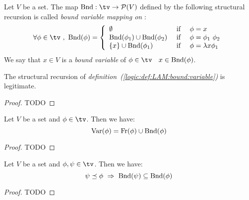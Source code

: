 \begin{defin}\label{logic:def:LAM:bound:variable}
    Let $V$ be a set. The map $\bound:\tv\to {\cal P}(V)$ defined by the
    following structural recursion is called {\em bound variable mapping on \tv}:
    \begin{equation}\label{logic:eqn:LAM:bound:var:recursion}
        \forall\phi\in\tv\ ,\ \bound(\phi)=
            \left\{\begin{array}{lcl}
                \emptyset&\mbox{\ if\ }&\phi=x
                \\
                \bound(\phi_{1})\cup\bound(\phi_{2}) 
                    &\mbox{\ if\ }&
                \phi=\phi_{1}\ \phi_{2}
                \\
                \{x\}\cup\bound(\phi_{1})&\mbox{\ if\ }&\phi=\lambda x\phi_{1}
            \end{array}\right.
    \end{equation}
    We say that $x\in V$ is a {\em bound variable} of $\phi\in\tv$ \ifand\ 
    $x\in\mbox{\rm Bnd}(\phi)$.
\end{defin}

\begin{prop}\label{logic:prop:LAM:bound:variable}
    The structural recursion of {\em 
    definition~(\ref{logic:def:LAM:bound:variable})} is legitimate.
\end{prop}
\begin{proof}
TODO
\end{proof}

\begin{prop}\label{logic:prop:LAM:boundvar:free}
    Let $V$ be a set and $\phi\in\tv$. Then we have:
    \begin{equation}\label{logic:eqn:LAM:boundvar:free:1}
        \mbox{\rm Var}(\phi)=\mbox{\rm Fr}(\phi)\cup\mbox{\rm Bnd}(\phi)
    \end{equation}
\end{prop}
\begin{proof}
TODO
\end{proof}

\begin{prop}\label{logic:prop:LAM:boundvar:subformula}
    Let $V$ be a set and $\phi,\psi\in\tv$. Then we have:
    \[
        \psi\preceq\phi\ \Rightarrow\ \bound(\psi)\subseteq\bound(\phi)
    \]
\end{prop}
\begin{proof}
TODO
\end{proof}

